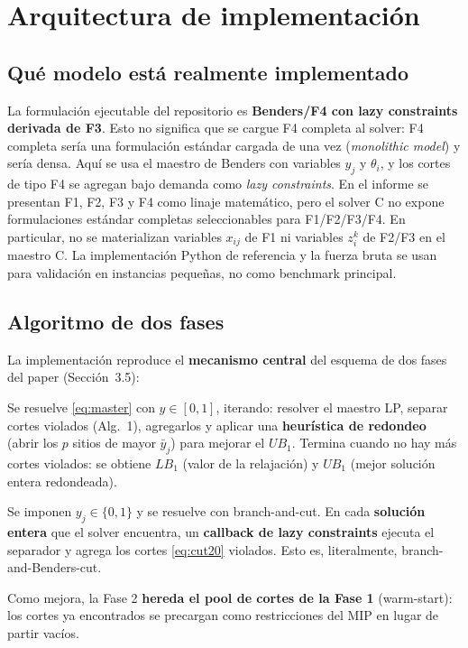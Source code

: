 \section{Arquitectura de implementación}
\label{sec:implementacion}

\subsection{Qué modelo está realmente implementado}
La formulación ejecutable del repositorio es \textbf{Benders/F4 con lazy constraints derivada de
F3}. Esto no significa que se cargue F4 completa al solver: F4 completa sería una formulación
estándar cargada de una vez (\emph{monolithic model}) y sería densa. Aquí se usa el maestro de
Benders con variables $y_j$ y $\theta_i$, y los cortes de tipo F4 se agregan bajo demanda como
\emph{lazy constraints}. En el informe se presentan F1, F2, F3 y F4 como linaje matemático, pero
el solver C no expone formulaciones estándar completas seleccionables para F1/F2/F3/F4. En
particular, no se materializan variables $x_{ij}$ de F1 ni variables $z_i^k$ de F2/F3 en el
maestro C. La implementación Python de referencia y la fuerza bruta se usan para validación en
instancias pequeñas, no como benchmark principal.

\subsection{Algoritmo de dos fases}
La implementación reproduce el \textbf{mecanismo central} del esquema de dos fases del paper
(Sección~3.5):
\begin{description}[leftmargin=1.5em]
  \item[Fase 1 — relajación lineal del maestro.] Se resuelve \eqref{eq:master} con $y\in[0,1]$,
        iterando: resolver el maestro LP, separar cortes violados (Alg.~1), agregarlos y aplicar
        una \textbf{heurística de redondeo} (abrir los $p$ sitios de mayor $\bar y_j$) para mejorar
        el $UB_1$. Termina cuando no hay más cortes violados: se obtiene $LB_1$ (valor de la
        relajación) y $UB_1$ (mejor solución entera redondeada).
  \item[Fase 2 — branch-and-Benders-cut.] Se imponen $y_j\in\{0,1\}$ y se resuelve con
        branch-and-cut. En cada \textbf{solución entera} que el solver encuentra, un
        \textbf{callback de lazy constraints} ejecuta el separador y agrega los cortes
        \eqref{eq:cut20} violados. Esto es, literalmente, branch-and-Benders-cut.
\end{description}
Como mejora, la Fase 2 \textbf{hereda el pool de cortes de la Fase 1} (warm-start): los cortes ya
encontrados se precargan como restricciones del MIP en lugar de partir vacíos.

